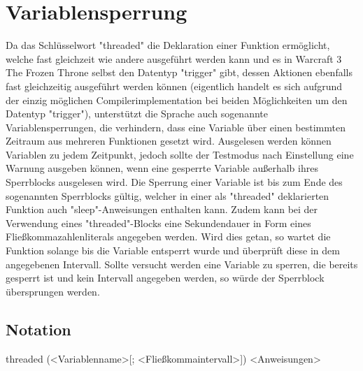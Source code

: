 \chapter{Variablensperrung}
Da das Schlüsselwort "threaded" die Deklaration einer Funktion ermöglicht, welche fast gleichzeit wie andere ausgeführt
werden kann und es in Warcraft 3 The Frozen Throne selbst den Datentyp "trigger" gibt, dessen Aktionen ebenfalls
fast gleichzeitig ausgeführt werden können (eigentlich handelt es sich aufgrund der einzig möglichen Compilerimplementation
bei beiden Möglichkeiten um den Datentyp "trigger"), unterstützt die Sprache auch sogenannte Variablensperrungen,
die verhindern, dass eine Variable über einen bestimmten Zeitraum aus mehreren Funktionen gesetzt wird.
Ausgelesen werden können Variablen zu jedem Zeitpunkt, jedoch sollte der Testmodus nach Einstellung eine Warnung
ausgeben können, wenn eine gesperrte Variable außerhalb ihres Sperrblocks ausgelesen wird.
Die Sperrung einer Variable ist bis zum Ende des sogenannten Sperrblocks gültig, welcher in einer als "threaded"
deklarierten Funktion auch "sleep"-Anweisungen enthalten kann.
Zudem kann bei der Verwendung eines "threaded"-Blocks eine Sekundendauer in Form eines Fließkommazahlenliterals
angegeben werden. Wird dies getan, so wartet die Funktion solange bis die Variable entsperrt wurde und überprüft
diese in dem angegebenen Intervall. Sollte versucht werden eine Variable zu sperren, die bereits gesperrt ist und
kein Intervall angegeben werden, so würde der Sperrblock übersprungen werden.

\section{Notation}
threaded (<Variablenname>[; <Fließkommaintervall>])
	<Anweisungen>